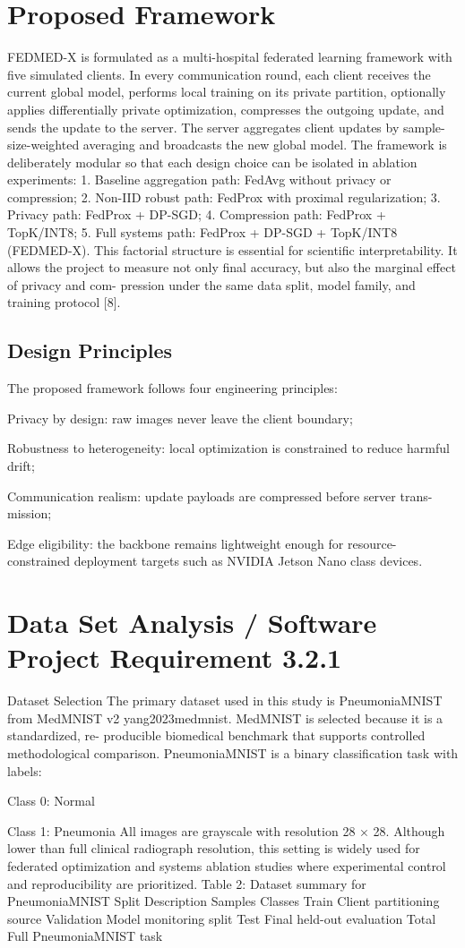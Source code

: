 \section{Proposed Framework}
FEDMED-X is formulated as a multi-hospital federated learning framework with five simulated clients. In every communication round, each client receives the current global model, performs local training on its private partition, optionally applies differentially private optimization, compresses the outgoing update, and sends the update to the server. The server aggregates client updates by sample-size-weighted averaging and broadcasts the new global model.
The framework is deliberately modular so that each design choice can be isolated in ablation experiments:
1. Baseline aggregation path: FedAvg without privacy or compression; 2. Non-IID robust path: FedProx with proximal regularization; 3. Privacy path: FedProx + DP-SGD; 4. Compression path: FedProx + TopK/INT8; 5. Full systems path: FedProx + DP-SGD + TopK/INT8 (FEDMED-X).
This factorial structure is essential for scientific interpretability. It allows the project to measure not only final accuracy, but also the marginal effect of privacy and com- pression under the same data split, model family, and training protocol [8].
\subsection{Design Principles}
The proposed framework follows four engineering principles:
\item Privacy by design: raw images never leave the client boundary;
\item Robustness to heterogeneity: local optimization is constrained to reduce harmful drift;

\item Communication realism: update payloads are compressed before server trans- mission;
\item Edge eligibility: the backbone remains lightweight enough for resource-constrained deployment targets such as NVIDIA Jetson Nano class devices.
\section{Data Set Analysis / Software Project Requirement 3.2.1}
Dataset Selection
The primary dataset used in this study is PneumoniaMNIST from MedMNIST v2 yang2023medmnist.
MedMNIST is selected because it is a standardized, re- producible biomedical benchmark that supports controlled methodological comparison.
PneumoniaMNIST is a binary classification task with labels:
\item Class 0: Normal
\item Class 1: Pneumonia
All images are grayscale with resolution 28 × 28. Although lower than full clinical radiograph resolution, this setting is widely used for federated optimization and systems ablation studies where experimental control and reproducibility are prioritized.
Table 2: Dataset summary for PneumoniaMNIST
Split
Description
Samples
Classes
Train
Client partitioning source
Validation
Model monitoring split
Test
Final held-out evaluation
Total
Full PneumoniaMNIST task


